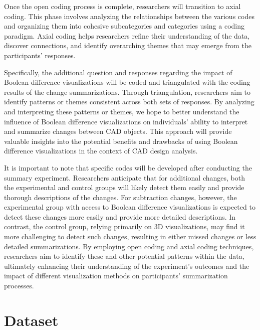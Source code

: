 \documentclass[sigconf,authorversion,nonacm]{acmart}
\begin{document}
Once the open coding process is complete, researchers will transition to axial coding. This phase involves analyzing the relationships between the various codes and organizing them into cohesive subcategories and categories using a coding paradigm.
Axial coding helps researchers refine their understanding of the data, discover connections, and identify overarching themes that may emerge from the participants' responses.

Specifically, the additional question and responses regarding the impact of Boolean difference visualizations will be coded and triangulated with the coding results of the change summarizations.
Through triangulation, researchers aim to identify patterns or themes consistent across both sets of responses. By analyzing and interpreting these patterns or themes, we hope to better understand the influence of Boolean difference visualizations on individuals' ability to interpret and summarize changes between CAD objects.
This approach will provide valuable insights into the potential benefits and drawbacks of using Boolean difference visualizations in the context of CAD design analysis.

It is important to note that specific codes will be developed after conducting the summary experiment. Researchers anticipate that for additional changes, both the experimental and control groups will likely detect them easily and provide thorough descriptions of the changes.
For subtraction changes, however, the experimental group with access to Boolean difference visualizations is expected to detect these changes more easily and provide more detailed descriptions.
In contrast, the control group, relying primarily on 3D visualizations, may find it more challenging to detect such changes, resulting in either missed changes or less detailed summarizations.
By employing open coding and axial coding techniques, researchers aim to identify these and other potential patterns within the data, ultimately enhancing their understanding of the experiment's outcomes and the impact of different visualization methods on participants' summarization processes.


\section{Dataset}
\end{document}
